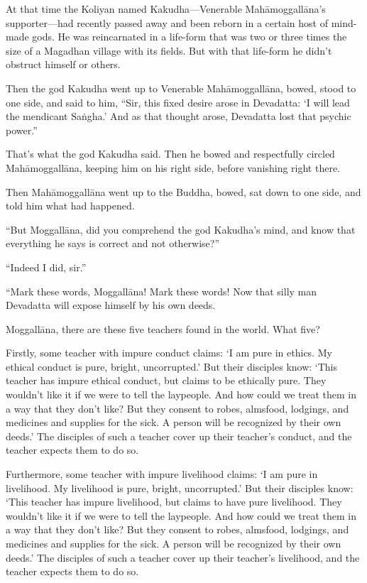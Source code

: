 \documentclass[12pt,openany]{book}%
\begin{document}
At that time the Koliyan named Kakudha—Venerable \textsanskrit{Mahāmoggallāna}’s supporter—had recently passed away and been reborn in a certain host of mind-made gods. He was reincarnated in a life-form that was two or three times the size of a Magadhan village with its fields. But with that life-form he didn’t obstruct himself or others. 

Then the god Kakudha went up to Venerable \textsanskrit{Mahāmoggallāna}, bowed, stood to one side, and said to him, “Sir, this fixed desire arose in Devadatta: ‘I will lead the mendicant \textsanskrit{Saṅgha}.’ And as that thought arose, Devadatta lost that psychic power.” 

That’s what the god Kakudha said. Then he bowed and respectfully circled \textsanskrit{Mahāmoggallāna}, keeping him on his right side, before vanishing right there. 

Then \textsanskrit{Mahāmoggallāna} went up to the Buddha, bowed, sat down to one side, and told him what had happened. 

“But \textsanskrit{Moggallāna}, did you comprehend the god Kakudha’s mind, and know that everything he says is correct and not otherwise?” 

“Indeed I did, sir.” 

“Mark these words, \textsanskrit{Moggallāna}! Mark these words! Now that silly man Devadatta will expose himself by his own deeds. 

\textsanskrit{Moggallāna}, there are these five teachers found in the world. What five? 

Firstly, some teacher with impure conduct claims: ‘I am pure in ethics. My ethical conduct is pure, bright, uncorrupted.’ But their disciples know: ‘This teacher has impure ethical conduct, but claims to be ethically pure. They wouldn’t like it if we were to tell the laypeople. And how could we treat them in a way that they don’t like? But they consent to robes, almsfood, lodgings, and medicines and supplies for the sick. A person will be recognized by their own deeds.’ The disciples of such a teacher cover up their teacher’s conduct, and the teacher expects them to do so. 

Furthermore, some teacher with impure livelihood claims: ‘I am pure in livelihood. My livelihood is pure, bright, uncorrupted.’ But their disciples know: ‘This teacher has impure livelihood, but claims to have pure livelihood. They wouldn’t like it if we were to tell the laypeople. And how could we treat them in a way that they don’t like? But they consent to robes, almsfood, lodgings, and medicines and supplies for the sick. A person will be recognized by their own deeds.’ The disciples of such a teacher cover up their teacher’s livelihood, and the teacher expects them to do so. 
\end{document}

